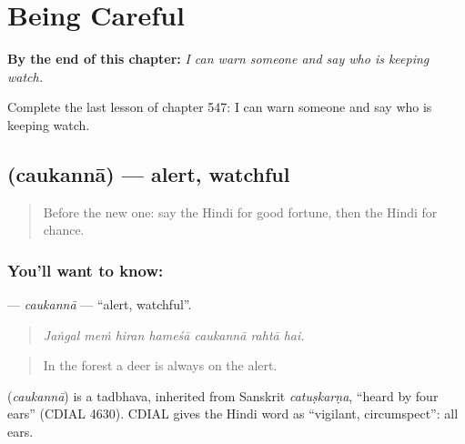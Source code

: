 
\chapter{Being Careful}
\label{ch:hi-being-careful}

\begin{chapteropening}
\textbf{By the end of this chapter:} \emph{I can warn someone and say who is keeping watch.}

Complete the last lesson of chapter 547: I can warn someone and say who is keeping watch.
\end{chapteropening}

\section[\texorpdfstring{\hi{चौकन्ना} (caukannā)}{चौकन्ना (caukannā)}]{ (caukannā) — alert, watchful}

\label{lesson:HI-C547-caukanna}



\begin{quote}
Before the new one: say the Hindi for good fortune, then the Hindi for chance.
\end{quote}

\subsection*{You'll want to know: }
\textbf{} — \emph{caukannā} — \textquotedblleft{}alert, watchful\textquotedblright{}.

\begin{quote}
      
\end{quote}

\begin{quote}
\emph{Jaṅgal meṁ hiran hameśā caukannā rahtā hai.}
\end{quote}

\begin{quote}
In the forest a deer is always on the alert.
\end{quote}

\begin{cousinweb}
\textbf{} (\emph{caukannā}) is a tadbhava, inherited from Sanskrit \emph{catuṣkarṇa}, \textquotedblleft{}heard by four ears\textquotedblright{} (CDIAL 4630). CDIAL gives the Hindi word as \textquotedblleft{}vigilant, circumspect\textquotedblright{}: all ears.
\end{cousinweb}

